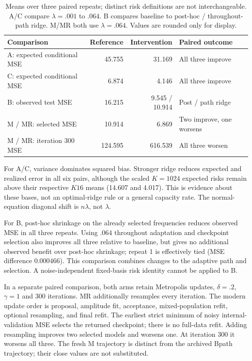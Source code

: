 \begin{table}[ht]
\centering\small
\caption{Means over three paired repeats; distinct risk definitions are not interchangeable. A/C compare $\lambda=.001$ to $.064$. B compares baseline to post-hoc / throughout-path ridge. M/MR both use $\lambda=.064$. Values are rounded only for display.}
\label{tab:drift_diagnostic}
\begin{tabular}{lrrl}\toprule
Comparison & Reference & Intervention & Paired outcome\\\midrule
A: expected conditional MSE & 45.755 & 31.169 & All three improve \\
C: expected conditional MSE & 6.874 & 4.146 & All three improve \\
B: observed test MSE & 16.215 & 9.545 / 10.914 & Post / path ridge \\
M / MR: selected MSE & 10.914 & 6.869 & Two improve, one worsens \\
M / MR: iteration 300 MSE & 124.595 & 616.539 & All three worsen \\
\bottomrule\end{tabular}
\end{table}

For A/C, variance dominates squared bias. Stronger ridge reduces expected and realized error in all six pairs, although the scaled $K=1024$ expected risks remain above their respective $K16$ means (14.607 and 4.017). This is evidence about these bases, not an optimal-ridge rule or a general capacity rate. The normal-equation diagonal shift is $n\lambda$, not $\lambda$.

For B, post-hoc shrinkage on the already selected frequencies reduces observed MSE in all three repeats. Using $.064$ throughout adaptation and checkpoint selection also improves all three relative to baseline, but gives no additional observed benefit over post-hoc shrinkage; repeat 1 is effectively tied (MSE difference $0.000466$). This comparison combines changes to the adaptive path and selection. A noise-independent fixed-basis risk identity cannot be applied to B.

In a separate paired comparison, both arms retain Metropolis updates, $\delta=.2$, $\gamma=1$ and 300 iterations. MR additionally resamples every iteration. The modern update order is proposal, amplitude fit, acceptance, mixed-population refit, optional resampling, and final refit. The earliest strict minimum of noisy internal-validation MSE selects the returned checkpoint; there is no full-data refit. Adding resampling improves two selected models and worsens one. At iteration 300 it worsens all three. The fresh M trajectory is distinct from the archived Bpath trajectory; their close values are not substituted.

